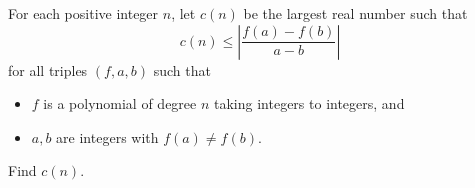 For each positive integer $ n$, let $ c(n)$ be the largest real number such that \[ c(n) \le \left| \frac {f(a) - f(b)}{a - b}\right|\] for all triples $ (f, a, b)$ such that
\begin{itemize}
	\item $ f$ is a polynomial of degree $ n$ taking integers to integers, and
	\item $ a, b$ are integers with $ f(a) \neq f(b)$.
\end{itemize}
Find $ c(n)$.